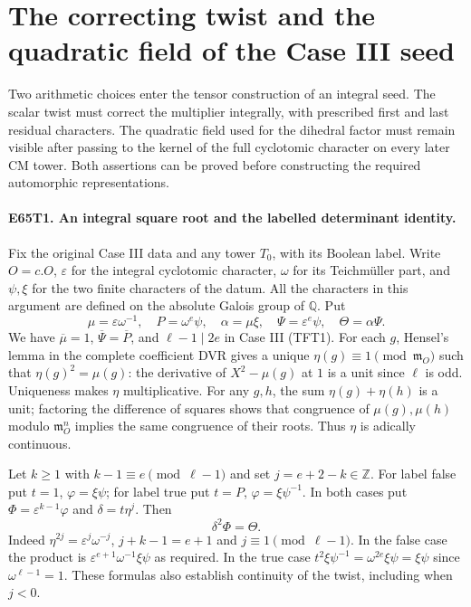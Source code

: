 \section{The correcting twist and the quadratic field of the Case III seed}

Two arithmetic choices enter the tensor construction of an integral seed.
The scalar twist must correct the multiplier integrally, with prescribed
first and last residual characters. The quadratic field used for the
dihedral factor must remain visible after passing to the kernel of the
full cyclotomic character on every later CM tower. Both assertions can be
proved before constructing the required automorphic representations.

\paragraph{E65T1. An integral square root and the labelled determinant identity.}
Fix the original Case III data and any tower $T_0$, with its Boolean label.
Write $O=c.O$, $\varepsilon$ for the integral cyclotomic character,
$\omega$ for its Teichm\"uller part, and $\psi,\xi$ for the two finite
characters of the datum. All the characters in this argument are defined
on the absolute Galois group of $\mathbb Q$. Put
\[
 \mu=\varepsilon\omega^{-1},\quad P=\omega^e\psi,\quad
 \alpha=\mu\xi,\quad \Psi=\varepsilon^e\psi,\quad
 \Theta=\alpha\Psi .
\]
We have $\overline\mu=1$, $\overline\Psi=\overline P$, and
$\ell-1\mid 2e$ in Case III (TFT1).
For each $g$, Hensel's lemma in the complete coefficient DVR gives a unique
$\eta(g)\equiv1\pmod{\mathfrak m_O}$ such that $\eta(g)^2=\mu(g)$:
the derivative of $X^2-\mu(g)$ at $1$ is a unit since $\ell$ is odd.
Uniqueness makes $\eta$ multiplicative. For any $g,h$, the sum
$\eta(g)+\eta(h)$ is a unit; factoring the difference of squares shows
that congruence of $\mu(g),\mu(h)$ modulo $\mathfrak m_O^n$ implies
the same congruence of their roots. Thus $\eta$ is adically continuous.

Let $k\ge1$ with $k-1\equiv e\pmod{\ell-1}$ and set $j=e+2-k\in\mathbb Z$.
For label false put $t=1$, $\varphi=\xi\psi$; for label true put
$t=P$, $\varphi=\xi\psi^{-1}$. In both cases put
$\Phi=\varepsilon^{k-1}\varphi$ and $\delta=t\eta^j$. Then
\[
                           \delta^2\Phi=\Theta .
\]
Indeed $\eta^{2j}=\varepsilon^j\omega^{-j}$, $j+k-1=e+1$ and
$j\equiv1\pmod{\ell-1}$. In the false case the product is
$\varepsilon^{e+1}\omega^{-1}\xi\psi$ as required. In the true case
$t^2\xi\psi^{-1}=\omega^{2e}\xi\psi=\xi\psi$ since $\omega^{\ell-1}=1$.
These formulas also establish continuity of the twist, including when $j<0$.

